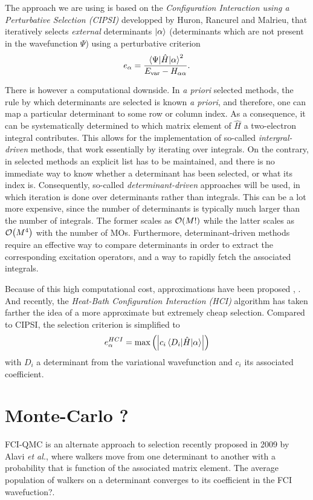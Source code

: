 \documentclass[./thesis.tex]{subfiles}
\begin{document}
The approach we are using is based on the \emph{Configuration Interaction using a Perturbative Selection (CIPSI)} developped by Huron, Rancurel and Malrieu,\cite{Huron_1973} that iteratively selects \emph{external} determinants ${\ket{\alpha}}$ (determinants which are not present in the wavefunction $\Psi$) using a perturbative criterion
\begin{equation}
e_\alpha = \frac{\mel{\Psi}{\hat{H}}{\alpha}^2}{E_\text{var} - H_{\alpha \alpha}}.
\end{equation}



There is however a computational downside. In \textit{a priori} selected methods, the rule by which determinants are selected is known \textit{a priori}, and therefore, one can map a particular determinant to some row or column index.\cite{Knowles_1984} As a consequence, it can be systematically determined to which matrix element of $\widehat{H}$ a two-electron integral contributes. This allows for the implementation of so-called \emph{intergral-driven} methods, that work essentially by iterating over integrals.
On the contrary, in selected methods an explicit list has to be maintained, and there is no immediate way to know whether a determinant has been selected, or what its index is. Consequently, so-called \emph{determinant-driven} approaches will be used, in which iteration is done over determinants rather than integrals. This can be a lot more expensive, since the number of determinants is typically much larger than the number of integrals. The former scales as $\order{M!}$ while the latter scales as $\order{M^4}$ with the number of MOs.
Furthermore, determinant-driven methods require an effective way to compare determinants in order to extract the corresponding excitation operators, and a way to rapidly fetch the associated integrals.

Because of this high computational cost, approximations have been proposed \cite{Evangelisti_1983},  . And recently, the \emph{Heat-Bath Configuration Interaction (HCI)} algorithm has taken farther the idea of a more approximate but extremely cheap selection\cite{Holmes_2016, Sharma_2017}. Compared to CIPSI, the selection criterion is simplified to
\begin{equation}
e^{HCI}_\alpha = \max \qty( \qty| c_i \mel{D_i}{\hat{H}}{\alpha} | )
\end{equation}
with $D_i$ a determinant from the variational wavefunction and $c_i$ its associated coefficient.

\section{Monte-Carlo ?}
FCI-QMC is an alternate approach to selection recently proposed in 2009 by Alavi \textit{et al.}\cite{Booth_2009,Booth_2010,Cleland_2010}, where walkers move from one determinant to another with a probability that is function of the associated matrix element. \alert{The average population of walkers on a determinant converges to its coefficient in the FCI wavefuction?}.
\end{document}
